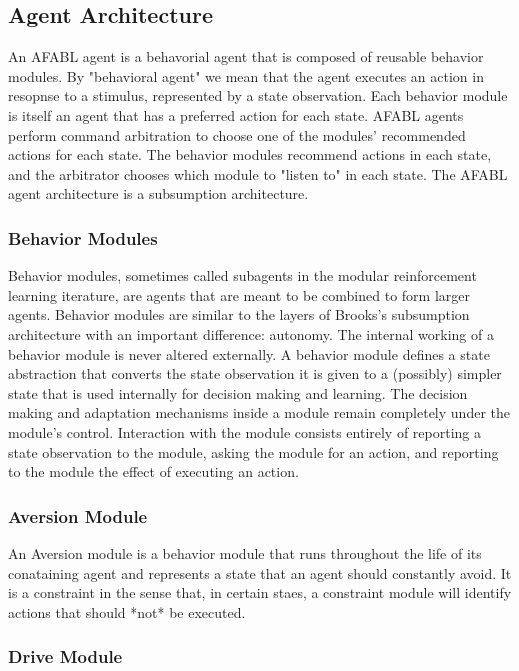 \subsection{Agent Architecture}

An AFABL agent is a behavorial agent that is composed of reusable
behavior modules.  By "behavioral agent" we mean that the agent
executes an action in resopnse to a stimulus, represented by a state
observation.  Each behavior module is itself an agent that has a
preferred action for each state.  AFABL agents perform command
arbitration to choose one of the modules' recommended actions for each
state.  The behavior modules recommend actions in each state, and the
arbitrator chooses which module to "listen to" in each state.  The
AFABL agent architecture is a subsumption architecture.

\subsubsection{Behavior Modules}

Behavior modules, sometimes called subagents in the modular
reinforcement learning iterature, are agents that are meant to be
combined to form larger agents.  Behavior modules are similar to the
layers of Brooks's subsumption architecture with an important
difference: autonomy.  The internal working of a behavior module is
never altered externally.  A behavior module defines a state
abstraction that converts the state observation it is given to a
(possibly) simpler state that is used internally for decision making
and learning.  The decision making and adaptation mechanisms inside a
module remain completely under the module's control.  Interaction with
the module consists entirely of reporting a state observation to the
module, asking the module for an action, and reporting to the module
the effect of executing an action.


\subsubsection{Aversion Module}

An Aversion module is a behavior module that runs throughout the life
of its conataining agent and represents a state that an agent should
constantly avoid.  It is a constraint in the sense that, in certain
staes, a constraint module will identify actions that should *not* be
executed.


\subsubsection{Drive Module}

